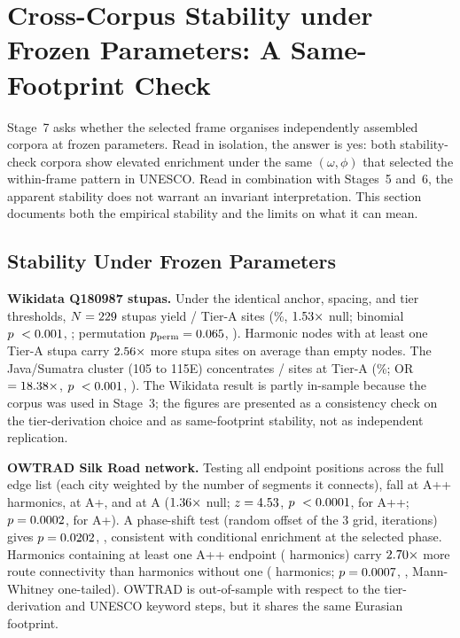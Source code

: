 \documentclass[12pt,a4paper]{article}
\newcommand{\degr}{\ifmmode{^\circ}\else\textdegree{}\fi}
\begin{document}
\section{Cross-Corpus Stability under Frozen Parameters: A Same-Footprint
Check}
\label{sec:cross_corpus}

Stage~7 asks whether the selected frame organises independently
assembled corpora at frozen parameters. Read in isolation, the answer
is yes: both stability-check corpora show elevated enrichment under
the same $(\omega, \phi)$ that selected the within-frame pattern in
UNESCO. Read in combination with Stages~5 and~6, the apparent
stability does not warrant an invariant interpretation. This section
documents both the empirical stability and the limits on what it can
mean.

\subsection{Stability Under Frozen Parameters}

\textbf{Wikidata Q180987 stupas.} Under the identical anchor, spacing,
and tier thresholds, $N = 229$ stupas yield
\wikiStupaATierCount/\wikiStupaTotal{} Tier-A sites
(\wikiStupaATierRate\%, $1.53\times$ null;
binomial $p\ < 0.001$, \wikiStupaATierBinomStar;
permutation $p_{\mathrm{perm}} = 0.065$,
\wikiStupaPermStar). Harmonic nodes with at least one Tier-A stupa
carry $2.56\times$ more stupa sites on average than
empty nodes. The Java/Sumatra cluster (105\degr{} to 115\degr{}E)
concentrates \wikiJavaTightATierN/\wikiJavaTightN{} sites at Tier-A
(\wikiJavaTightATierRate\%; OR $= 18.38\times$,
$p\ \wikiJavaTightATierP$, \wikiJavaTightATierPSig{}). The Wikidata
result is partly in-sample because the corpus was used in Stage~3;
the figures are presented as a consistency check on the tier-derivation
choice and as same-footprint stability, not as independent
replication.

\textbf{OWTRAD Silk Road network.} Testing all \NOwtradDegW{}
endpoint positions across the full edge list (each city weighted by
the number of segments it connects), \NOwtradDegWApp{} fall at A++
harmonics, \NOwtradDegWAp{} at A+, and \NOwtradDegWA{} at A
($1.36\times$ null; $z = 4.53$,
$p\ < 0.0001$, \pOwtradDegWAppSig{} for A++; $p = 0.0002$,
\pOwtradDegWApSig{} for A+). A phase-shift test (random offset of the
3\degr{} grid, \NOwtradPerms{} iterations) gives
$p = 0.0202$, \pOwtradVertexAppPhaseSig{}, consistent
with conditional enrichment at the selected phase. Harmonics
containing at least one A++ endpoint (\NOwtradAppHarmonics{} harmonics)
carry $2.70\times$ more route connectivity than
harmonics without one (\NOwtradNonAppHarmonics{} harmonics;
$p = 0.0007$, \pOwtradClustDegSig{}, Mann-Whitney one-tailed).
OWTRAD is out-of-sample with respect to the tier-derivation and UNESCO
keyword steps, but it shares the same Eurasian footprint.
\end{document}
